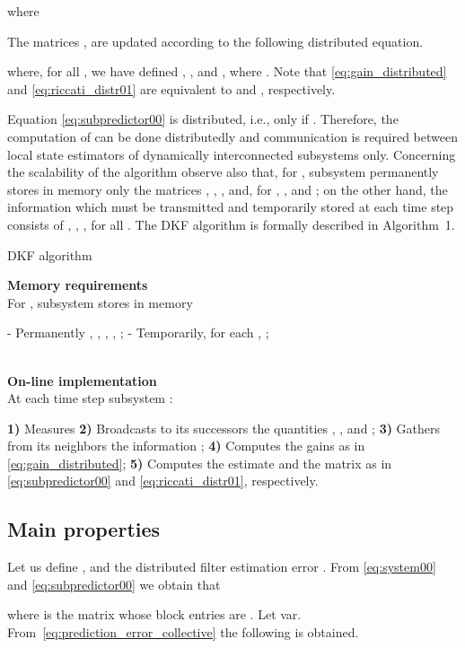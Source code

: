 \documentclass[journal,10pt,draftcls,onecolumn]{IEEEtran}
\begin{document}
where

The matrices ,  are updated according to the following distributed equation.

where, for all , we have defined , , and , where . Note that \eqref{eq:gain_distributed} and \eqref{eq:riccati_distr01} are equivalent to  and , respectively.

Equation \eqref{eq:subpredictor00} is distributed, i.e.,  only if . Therefore, the computation of  can be done distributedly and communication is required between local state estimators of dynamically interconnected subsystems only. Concerning the scalability of the algorithm observe also that, for , subsystem  permanently stores in memory only the matrices , , ,  and, for , ,  and ; on the other hand, the information which must be transmitted and temporarily stored at each time step consists of , , ,  for all . The DKF algorithm is formally described in Algorithm~1.

\begin{algorithm}
\label{algo:DKF}
\caption{DKF algorithm}
\textbf{Memory requirements}\\
For , subsystem  stores in memory
\begin{algorithmic}
\State - Permanently , , , , ;
\State - Temporarily, for each , ;
\end{algorithmic}
\hrulefill \\
\textbf{On-line implementation}\\
At each time step  subsystem :
\begin{algorithmic}
\State \textbf{1)} Measures 
\State \textbf{2)} Broadcasts to its successors the quantities , , and ;
\State \textbf{3)} Gathers from its neighbors the information ;
\State \textbf{4)} Computes the gains  as in \eqref{eq:gain_distributed};
\State \textbf{5)} Computes the estimate  and the matrix  as in \eqref{eq:subpredictor00} and \eqref{eq:riccati_distr01}, respectively.
\end{algorithmic}
\end{algorithm}
\subsection{Main properties}
Let us define , and the distributed filter estimation error . From \eqref{eq:system00} and \eqref{eq:subpredictor00} we obtain that

where  is the matrix whose block entries are . Let var. From~\eqref{eq:prediction_error_collective} the following is obtained.
\end{document}
